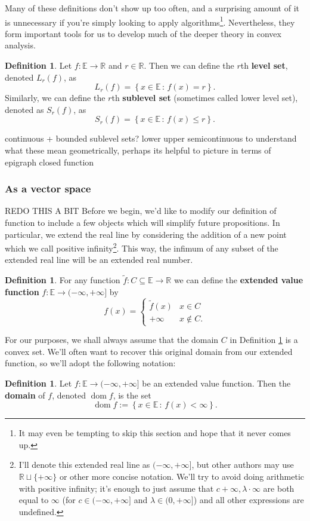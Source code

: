\documentclass{article}
\numberwithin{equation}{section}
\theoremstyle{definition}
\newtheorem{definition}[theorem]{Definition}%
\newcommand{\bE}{\mathbb{E}}
\newcommand{\bR}{\mathbb{R}}
\newcommand{\set}[2]{\left\{#1\,:\,#2\right\}}
\newcommand{\dom}{\operatorname{dom}}
\begin{document}
Many of these definitions don't show up too often, and a surprising amount of it is unnecessary if you're simply looking to apply algorithms\footnote{It may even be tempting to skip this section and hope that it never comes up.}. Nevertheless, they form important tools for us to develop much of the deeper theory in convex analysis.
\begin{definition}
    Let $f:\bE\to\bR$ and $r\in\bR$. Then we can define the $r$th \textbf{level set}, denoted $L_r(f)$, as
    \begin{equation}
        L_r(f)=\set{x\in\bE}{f(x)=r}.
    \end{equation}
    Similarly, we can define the $r$th \textbf{sublevel set} (sometimes called lower level set), denoted as $S_r(f)$, as
    \begin{equation}
        S_r(f)=\set{x\in\bE}{f(x)\le r}.
    \end{equation}
\end{definition}
continuous + bounded sublevel sets?
lower upper semicontinuous
to understand what these mean geometrically, perhaps its helpful to picture in terms of epigraph
closed function
\subsubsection{As a vector space}
REDO THIS A BIT
Before we begin, we'd like to modify our definition of function to include a few objects which will simplify future propositions. In particular, we extend the real line by considering the addition of a new point which we call positive infinity\footnote{I'll denote this extended real line as $(-\infty,+\infty]$, but other authors may use $\bR\sqcup\{+\infty\}$ or other more concise notation. We'll try to avoid doing arithmetic with positive infinity; it's enough to just assume that $c+\infty, \lambda\cdot \infty$ are both equal to $\infty$ (for $c\in(-\infty,+\infty]$ and $\lambda\in(0,+\infty]$) and all other expressions are undefined.}. This way, the infimum of any subset of the extended real line will be an extended real number.
\begin{definition}
\label{defevf}%
    For any function $\tilde f:C\subseteq\bE\to\bR$ we can define the \textbf{extended value function} $f:\bE\to(-\infty,+\infty]$ by
    \begin{equation}
        f(x)=\begin{cases}
            \tilde f(x)& x\in C\\
            +\infty & x\not\in C.
        \end{cases}
    \end{equation}
\end{definition}
For our purposes, we shall always assume that the domain $C$ in Definition \ref{defevf} is a convex set. We'll often want to recover this original domain from our extended function, so we'll adopt the following notation:
\begin{definition}
    Let $f:\bE\to(-\infty,+\infty]$ be an extended value function. Then the \textbf{domain} of $f$, denoted $\dom f$, is the set
    \begin{equation}
        \dom f:=\set{x\in\bE}{f(x)<\infty}.
    \end{equation}
\end{definition}
\end{document}
